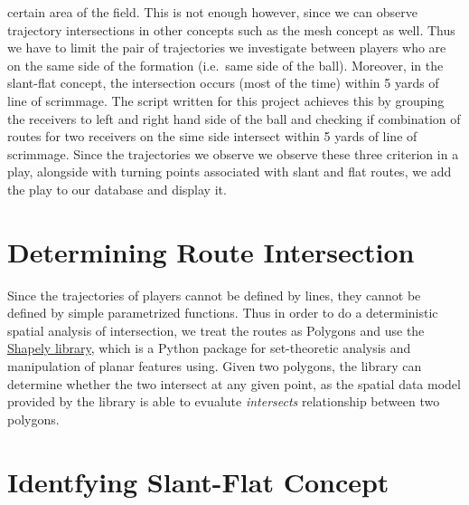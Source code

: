 \documentclass[12pt,oneside]{dukestatscithesis}
\theoremstyle{definition}
\theoremstyle{definition}
\theoremstyle{definition}
\theoremstyle{remark}
\begin{document}
certain area of the field. This is not enough however, since we can
observe trajectory intersections in other concepts such as the mesh
concept as well. Thus we have to limit the pair of trajectories we
investigate between players who are on the same side of the formation
(i.e.~same side of the ball). Moreover, in the slant-flat concept, the
intersection occurs (most of the time) within 5 yards of line of
scrimmage. The script written for this project achieves this by grouping
the receivers to left and right hand side of the ball and checking if
combination of routes for two receivers on the sime side intersect
within 5 yards of line of scrimmage. Since the trajectories we observe
we observe these three criterion in a play, alongside with turning
points associated with slant and flat routes, we add the play to our
database and display it.

\section{Determining Route
Intersection}\label{determining-route-intersection}

Since the trajectories of players cannot be defined by lines, they
cannot be defined by simple parametrized functions. Thus in order to do
a deterministic spatial analysis of intersection, we treat the routes as
Polygons and use the
\href{https://shapely.readthedocs.io/en/latest/manual.html\#introduction}{Shapely
library}, which is a Python package for set-theoretic analysis and
manipulation of planar features using. Given two polygons, the library
can determine whether the two intersect at any given point, as the
spatial data model provided by the library is able to evualute
\emph{intersects} relationship between two polygons.

\section{Identfying Slant-Flat
Concept}\label{identfying-slant-flat-concept}
\end{document}

